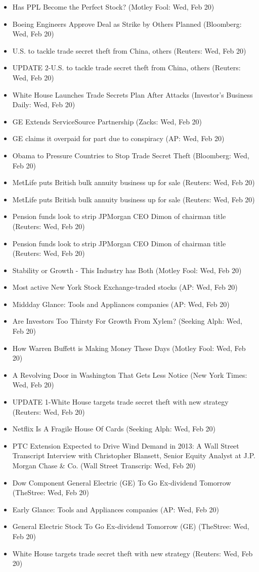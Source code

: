 \documentclass[11pt,asymmetric]{article}
\begin{document}
\begin{itemize}
\item Has PPL Become the Perfect Stock? (Motley Fool: Wed, Feb 20)
\item Boeing Engineers Approve Deal as Strike by Others Planned (Bloomberg: Wed, Feb 20)
\item U.S. to tackle trade secret theft from China, others (Reuters: Wed, Feb 20)
\item UPDATE 2-U.S. to tackle trade secret theft from China, others (Reuters: Wed, Feb 20)
\item White House Launches Trade Secrets Plan After Attacks (Investor's Business Daily: Wed, Feb 20)
\item GE Extends ServiceSource Partnership (Zacks: Wed, Feb 20)
\item GE claims it overpaid for part due to conspiracy (AP: Wed, Feb 20)
\item Obama to Pressure Countries to Stop Trade Secret Theft (Bloomberg: Wed, Feb 20)
\item MetLife puts British bulk annuity business up for sale (Reuters: Wed, Feb 20)
\item MetLife puts British bulk annuity business up for sale (Reuters: Wed, Feb 20)
\item Pension funds look to strip JPMorgan CEO Dimon of chairman title (Reuters: Wed, Feb 20)
\item Pension funds look to strip JPMorgan CEO Dimon of chairman title (Reuters: Wed, Feb 20)
\item Stability or Growth - This Industry has Both (Motley Fool: Wed, Feb 20)
\item Most active New York Stock Exchange-traded stocks (AP: Wed, Feb 20)
\item Middday Glance: Tools and Appliances companies (AP: Wed, Feb 20)
\item Are Investors Too Thirsty For Growth From Xylem? (Seeking Alph: Wed, Feb 20)
\item How Warren Buffett is Making Money These Days (Motley Fool: Wed, Feb 20)
\item A Revolving Door in Washington That Gets Less Notice (New York Times: Wed, Feb 20)
\item UPDATE 1-White House targets trade secret theft with new strategy (Reuters: Wed, Feb 20)
\item Netflix Is A Fragile House Of Cards (Seeking Alph: Wed, Feb 20)
\item PTC Extension Expected to Drive Wind Demand in 2013: A Wall Street Transcript Interview with Christopher Blansett, Senior Equity Analyst at J.P. Morgan Chase \& Co. (Wall Street Transcrip: Wed, Feb 20)
\item Dow Component General Electric (GE) To Go Ex-dividend Tomorrow (TheStree: Wed, Feb 20)
\item Early Glance: Tools and Appliances companies (AP: Wed, Feb 20)
\item General Electric Stock To Go Ex-dividend Tomorrow (GE) (TheStree: Wed, Feb 20)
\item White House targets trade secret theft with new strategy (Reuters: Wed, Feb 20)
\end{itemize}
\end{document}
